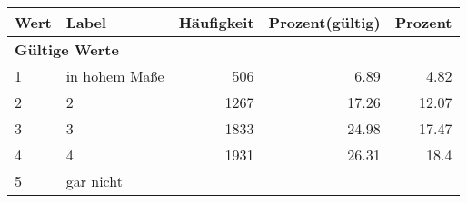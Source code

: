     \begin{longtable}{lXrrr}
     \toprule
     \textbf{Wert} & \textbf{Label} & \textbf{Häufigkeit} & \textbf{Prozent(gültig)} & \textbf{Prozent} \\
     \endhead
     \midrule
     \multicolumn{5}{l}{\textbf{Gültige Werte}}\\

     1 &
     \multicolumn{1}{X}{ in hohem Maße   } &


       \num{506} &
       \num[round-mode=places,round-precision=2]{6,89} &
         \num[round-mode=places,round-precision=2]{4,82} \\

     2 &
     \multicolumn{1}{X}{ 2   } &


       \num{1267} &
       \num[round-mode=places,round-precision=2]{17,26} &
         \num[round-mode=places,round-precision=2]{12,07} \\

     3 &
     \multicolumn{1}{X}{ 3   } &


       \num{1833} &
       \num[round-mode=places,round-precision=2]{24,98} &
         \num[round-mode=places,round-precision=2]{17,47} \\

     4 &
     \multicolumn{1}{X}{ 4   } &


       \num{1931} &
       \num[round-mode=places,round-precision=2]{26,31} &
         \num[round-mode=places,round-precision=2]{18,4} \\

     5 &
     \multicolumn{1}{X}{ gar nicht   } &



\end{longtable}
